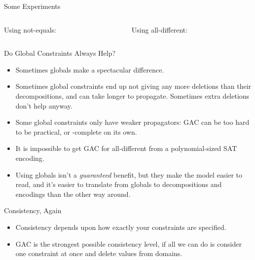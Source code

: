 \documentclass[aspectratio=169,compress,10pt]{beamer}
\begin{document}
\begin{frame}[t]{Some Experiments}
     {
        \begin{columns}[t]
            \begin{column}{0.45\textwidth}
                Using not-equals:
                
            \end{column}
            \begin{column}{0.45\textwidth}
                 {
                    Using all-different:
                    
                }
            \end{column}
        \end{columns}
    }
\end{frame}

\begin{frame}{Do Global Constraints Always Help?}
    \begin{itemize}
        \item Sometimes globals make a spectacular difference.

        \item Sometimes global constraints end up not giving any more deletions than their
            decompositions, and can take longer to propagate. Sometimes extra deletions don't help
            anyway.

        \item Some global constraints only have weaker propagators: GAC can be too hard to be
            practical, or \NP-complete on its own.

        \item It is impossible to get GAC for all-different from a polynomial-sized SAT encoding.

        \item Using globals isn't a \emph{guaranteed} benefit, but they make the model easier to
            read, and it's easier to translate from globals to decompositions and encodings than the
            other way around.
    \end{itemize}
\end{frame}

\begin{frame}{Consistency, Again}
    \begin{itemize}
        \item Consistency depends upon how exactly your constraints are specified.
        \item GAC is the strongest possible consistency level, if all we can do is consider one
            constraint at once and delete values from domains.
    \end{itemize}
\end{frame}
\end{document}
